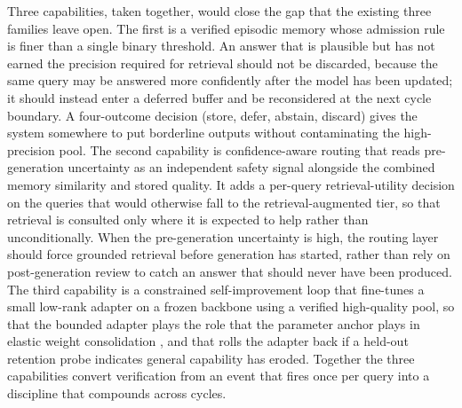 Three capabilities, taken together, would close the gap that the existing three families leave open. The first is a verified episodic memory whose admission rule is finer than a single binary threshold. An answer that is plausible but has not earned the precision required for retrieval should not be discarded, because the same query may be answered more confidently after the model has been updated; it should instead enter a deferred buffer and be reconsidered at the next cycle boundary. A four-outcome decision (store, defer, abstain, discard) gives the system somewhere to put borderline outputs without contaminating the high-precision pool. The second capability is confidence-aware routing that reads pre-generation uncertainty as an independent safety signal alongside the combined memory similarity and stored quality. It adds a per-query retrieval-utility decision on the queries that would otherwise fall to the retrieval-augmented tier, so that retrieval is consulted only where it is expected to help rather than unconditionally. When the pre-generation uncertainty is high, the routing layer should force grounded retrieval before generation has started, rather than rely on post-generation review to catch an answer that should never have been produced. The third capability is a constrained self-improvement loop that fine-tunes a small low-rank adapter on a frozen backbone using a verified high-quality pool, so that the bounded adapter plays the role that the parameter anchor plays in elastic weight consolidation \cite{doi:10.1073/pnas.1611835114}, and that rolls the adapter back if a held-out retention probe indicates general capability has eroded. Together the three capabilities convert verification from an event that fires once per query into a discipline that compounds across cycles.

